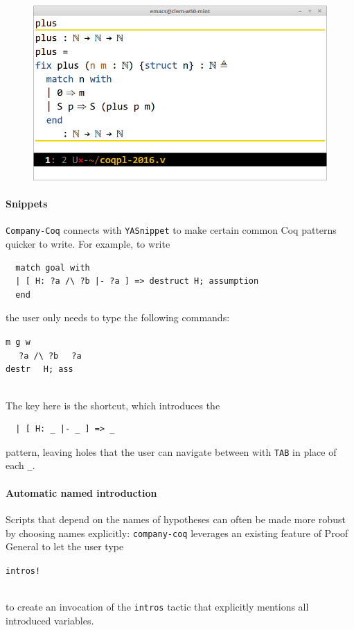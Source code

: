\documentclass[preprint]{sigplanconf}
\newlength{\almostverbatimindentation}
\newenvironment{almostverbatim}{%
\sbox0{\texttt{\global\almostverbatimindentation=2\fontdimen2\font}}
\\[\topsep]\hspace*{\almostverbatimindentation}\begin{minipage}{0.94\linewidth}\setlength{\baselineskip}{1.5\baselineskip}%
}{%
\end{minipage}\\[\topsep]
}
\newcommand{\proofg}{Proof General\xspace}
\begin{document}
\begin{figure}[H]
  \centering
  \includegraphics[width=\linewidth]{inline-docs-xxl-2.png}
\end{figure}

\paragraph{Snippets} \texttt{Company-Coq} connects with \texttt{YASnippet} to make certain common Coq patterns quicker to write. For example, to write
\begin{verbatim}
  match goal with
  | [ H: ?a /\ ?b |- ?a ] => destruct H; assumption
  end
\end{verbatim}
the user only needs to type the following commands:
\begin{almostverbatim}
  \verb|m g w | \keys{\return}\\
  \keys{\Alt+\shift+\return} \verb| | \keys{\tab} \verb| ?a /\ ?b | \keys{\tab} \verb| ?a | \keys{\tab}\\
  \verb|destr | \keys{\return} \verb| H; ass | \keys{\return}
\end{almostverbatim}
The key here is the \keys{\Alt+\shift+\return} shortcut, which introduces the
\begin{verbatim}
  | [ H: _ |- _ ] => _
\end{verbatim}
pattern, leaving holes that the user can navigate between with \texttt{TAB} in place of each \texttt{\_}.

\paragraph{Automatic named introduction} Scripts that depend on the names of hypotheses can often be made more robust by choosing names explicitly: \texttt{company-coq} leverages an existing feature of \proofg to let the user type
\begin{almostverbatim}
  \verb|intros! |\keys{\return}
\end{almostverbatim}
to create an invocation of the \texttt{intros} tactic that explicitly mentions all introduced variables.
\end{document}
